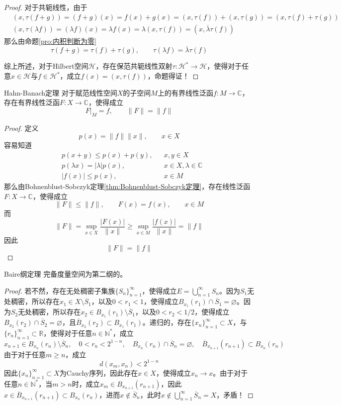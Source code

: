 \documentclass[lang = cn, scheme = chinese, thmcnt = section]{elegantbook}
\newcommand{\N}{\mathbb{N}}            %
\newcommand{\R}{\mathbb{R}}            %
\newcommand{\C}{\mathbb{C}}  		   %
\newcommand{\sub}{\subset}             %
\begin{document}
\begin{proof}
	对于共轭线性，由于
	\begin{align*}
		&(x,\tau(f+g))=(f+g)(x)=f(x)+g(x)=(x,\tau(f))+(x,\tau(g))=(x,\tau(f)+\tau(g))\\
		&(x,\tau(\lambda f))=(\lambda f)(x)=\lambda f(x)=\lambda (x,\tau(f))=(x,\overline{\lambda}\tau(f))
	\end{align*}
	那么由命题\ref{pro:内积判断为零}
	$$
	\tau(f+g)=\tau(f)+\tau(g),\qquad 
	\tau(\lambda f)=\overline{\lambda }\tau(f)
	$$
	
	综上所述，对于Hilbert空间$\mathcal{H}$，存在保范共轭线性双射$\tau:\mathcal{H}^*\to \mathcal{H}$，使得对于任意$x\in \mathcal{H}$与$f\in \mathcal{H}^*$，成立$f(x)=(x,\tau(f))$，命题得证！
\end{proof}

\begin{theorem}{Hahn-Banach定理}
	对于赋范线性空间$X$的子空间$M$上的有界线性泛函$f:M\to\C$，存在有界线性泛函$F:X\to\C$，使得成立
	$$
	F|_M=f,\qquad 
	\|F\|=\|f\|
	$$
\end{theorem}

\begin{proof}
	定义
	$$
	p(x)=\|f\|\|x\|,\qquad x\in X
	$$
	容易知道
	\begin{align*}
		&p(x+y)\le p(x)+p(y),&& x,y\in X\\
		&p(\lambda x)=|\lambda| p(x),&& x\in X,\lambda\in \C\\
		&|f(x)|\le p(x),&& x\in M
	\end{align*}
	那么由Bohnenblust-Sobczyk定理\ref{thm:Bohnenblust-Sobczyk定理}，存在线性泛函$F:X\to\C$​，使得成立
	$$
	\|F\|\le\|f\|,\qquad F(x)=f(x),\qquad  x\in M
	$$
	而
	$$
	\|F\|=\sup_{x\in X}\frac{|F(x)|}{\|x\|}\ge \sup_{x\in M}\frac{|f(x)|}{\|x\|}=\|f\|
	$$
	因此
	$$
	\|F\|=\|f\|
	$$
\end{proof}

\begin{theorem}{Baire纲定理}
	完备度量空间为第二纲的。
\end{theorem}

\begin{proof}
	若不然，存在无处稠密子集族$\{ S_n \}_{n=1}^{\infty}$，使得成立$\displaystyle E=\bigcup_{n=1}^{\infty}S_n$。因为$S_1$无处稠密，所以存在$x_1\in X\setminus \overline{S}_1$，以及$0<r_1<1$，使得成立$B_{x_1}(r_1)\cap \overline{S}_1=\varnothing$。因为$S_2$无处稠密，所以存在$x_2\in B_{x_1}(r_1)\setminus \overline{S}_1$，以及$0<r_2<1/2$，使得成立$B_{x_2}(r_2)\cap \overline{S}_2=\varnothing$，且$\overline{B}_{x_2}(r_2)\sub B_{x_1}(r_1)$。递归的，存在$\{ x_n \}_{n=1}^{\infty}\sub X$，与$\{ r_n \}_{n=1}^{\infty}\sub \R$，使得对于任意$n\in\N^*$，成立
	$$
	x_{n+1}\in B_{x_n}(r_n)\setminus\overline{S}_n,\quad 
	0<r_n<2^{1-n},\quad
	B_{x_n}(r_n)\cap \overline{S}_n=\varnothing,\quad 
	\overline{B}_{x_{n+1}}(r_{n+1})\sub B_{x_n}(r_n)
	$$
	由于对于任意$m\ge n$，成立
	$$
	d(x_m,x_n)<2^{1-n}
	$$
	因此$\{ x_n \}_{n=1}^{\infty}\sub X$为Cauchy序列，因此存在$x\in X$，使得成立$x_n\to x$。由于对于任意$n\in\N^*$，当$m>n$时，成立$x_m\in B_{x_{n+1}}(r_{n+1})$，因此$x\in \overline{B}_{x_{n+1}}(r_{n+1})\sub B_{x_{n}}(r_{n})$，进而$x\notin \overline{S}_{n}$，此时$\displaystyle x\notin\bigcup_{n=1}^{\infty}\overline{S}_n=X$，矛盾！
\end{proof}
\end{document}

